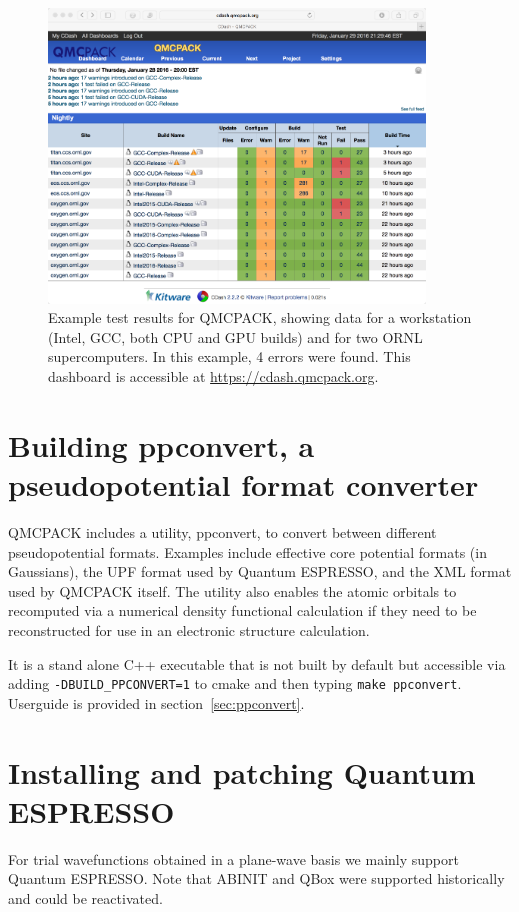 \begin{figure}
  \centering
  \includegraphics[width=10cm]{./figures/QMCPACK_CDash_CTest_Results_20160129.png}
  \caption{Example test results for QMCPACK, showing data for a
    workstation (Intel, GCC, both CPU and GPU builds) and for two ORNL
    supercomputers. In this example, 4 errors were found. This
    dashboard is accessible at \url{https://cdash.qmcpack.org}.}
\end{figure}

\section{Building ppconvert, a pseudopotential format converter}
\label{sec:buildppconvert}
QMCPACK includes a utility, ppconvert, to convert between different
pseudopotential formats. Examples include effective core potential
formats (in Gaussians), the UPF format used by Quantum ESPRESSO, and
the XML format used by QMCPACK itself. The utility also enables the
atomic orbitals to recomputed via a numerical density functional
calculation if they need to be reconstructed for use in an
electronic structure calculation.

It is a stand alone C++ executable that is not built by default but accessible via adding
\texttt{-DBUILD\_PPCONVERT=1} to cmake and then typing \texttt{make ppconvert}.
Userguide is provided in section~\ref{sec:ppconvert}.

\section{Installing and patching Quantum ESPRESSO}
\label{sec:buildqe}
For trial wavefunctions obtained in a plane-wave basis we mainly
support Quantum ESPRESSO. Note that ABINIT and QBox were supported historically
and could be reactivated.

